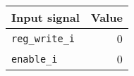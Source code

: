 {
\footnotesize
\begin{tabular}{|l|r|}
  \hline
  \cellcolor{gray!20}\textbf{Input signal} & \cellcolor{gray!20}\textbf{Value} \\
  \hline
  \texttt{reg\_write\_i} & 0 \\
  \hline
  \texttt{enable\_i} & 0 \\
  \hline
\end{tabular}
}
